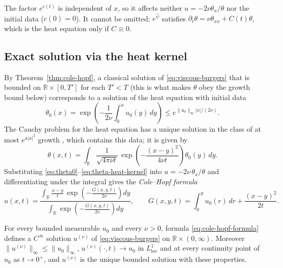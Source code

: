 \begin{remark}
The factor $e^{c(t)}$ is independent of $x$, so it affects neither
$u=-2\nu\theta_x/\theta$ nor the initial data ($c(0)=0$). It cannot be
omitted: $e^{\hat\psi}$ satisfies $\partial_t\theta=\nu\theta_{xx}+C(t)\theta$,
which is the heat equation only if $C\equiv0$.
\end{remark}

\subsection{Exact solution via the heat kernel}
\label{subsec:cole-hopf-solution}

By Theorem~\ref{thm:cole-hopf}, a classical solution of \eqref{eq:viscous-burgers}
that is bounded on $\mathbb{R}\times[0,T']$ for each $T'<T$ (this is what makes
$\theta$ obey the growth bound below) corresponds to a solution of the heat
equation with initial data
\begin{equation}
  \label{eq:theta0}
  \theta_0(x) = \exp\left(-\frac{1}{2\nu}\int_0^x u_0(y)\, dy\right)
  \le e^{\|u_0\|_\infty|x|/(2\nu)} .
\end{equation}
The Cauchy problem for the heat equation has a unique solution in the class of
at most $e^{a|x|^2}$ growth \cite[\S2.3.3]{evans2010}, which contains this
data; it is given by
\begin{equation}
  \label{eq:theta-heat-kernel}
  \theta(x,t) = \int_{\mathbb{R}} \frac{1}{\sqrt{4\pi\nu t}}\,
    \exp\left(-\frac{(x-y)^2}{4\nu t}\right) \theta_0(y)\, dy.
\end{equation}
Substituting \eqref{eq:theta0}--\eqref{eq:theta-heat-kernel} into
$u=-2\nu\,\theta_x/\theta$ and differentiating under the integral gives the
\emph{Cole--Hopf formula}
\begin{equation}
  \label{eq:cole-hopf-formula}
  u(x,t) = \frac{\displaystyle\int_{\mathbb{R}} \frac{x-y}{t}\, \exp\left(-\frac{G(x,y,t)}{2\nu}\right) dy}
                {\displaystyle\int_{\mathbb{R}} \exp\left(-\frac{G(x,y,t)}{2\nu}\right) dy},
  \qquad
  G(x,y,t) = \int_0^y u_0(r)\, dr + \frac{(x-y)^2}{2t}.
\end{equation}

\begin{corollary}
\label{cor:global-smoothness}
For every bounded measurable $u_0$ and every $\nu>0$, formula
\eqref{eq:cole-hopf-formula} defines a $C^\infty$ solution $u^{(\nu)}$ of
\eqref{eq:viscous-burgers} on $\mathbb{R}\times(0,\infty)$. Moreover
$\|u^{(\nu)}\|_\infty\le\|u_0\|_\infty$, $u^{(\nu)}(\cdot,t)\to u_0$ in
$L^1_{\mathrm{loc}}$ and at every continuity point of $u_0$ as $t\to0^+$, and
$u^{(\nu)}$ is the unique bounded solution with these properties.
\end{corollary}

